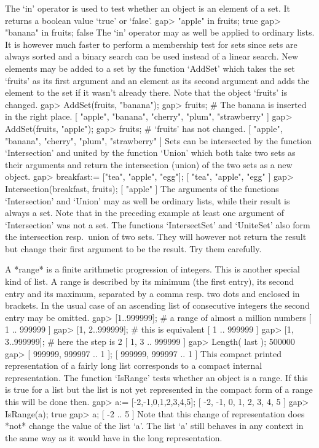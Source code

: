 The `in' operator is  used  to test whether an  object is an element of a
set.  It returns a boolean value `true' or `false'.
\beginexample
    gap> "apple" in fruits;
    true
    gap> "banana" in fruits;
    false 
\endexample
The `in' operator may as well be applied to ordinary lists. It is however
much faster to perform  a membership test for sets  since sets are always
sorted and a binary  search can be used instead  of a linear search.  New
elements may be added to a  set by the function  `AddSet' which takes the
set `fruits' as its first argument and an  element as its second argument
and adds the element to the set if it wasn't already there. Note that the
object `fruits' is changed.
\beginexample
    gap> AddSet(fruits, "banana");
    gap> fruits;        #  The banana is inserted in the right place.
    [ "apple", "banana", "cherry", "plum", "strawberry" ]
    gap> AddSet(fruits, "apple");
    gap> fruits;        #  `fruits' has not changed.
    [ "apple", "banana", "cherry", "plum", "strawberry" ] 
\endexample
Sets can be intersected by the function `Intersection'  and united by the
function `Union' which both take  two sets as their arguments  and return
the intersection (union) of the two sets as a new object.
\beginexample
    gap> breakfast:= ["tea", "apple", "egg"];
    [ "tea", "apple", "egg" ]
    gap> Intersection(breakfast, fruits);
    [ "apple" ] 
\endexample
The arguments of the functions `Intersection' and `Union'  may as well be
ordinary lists,  while  their result is  always  a set. Note that  in the
preceding example at least one argument of  `Intersection' was not a set.
The functions `IntersectSet'  and `UniteSet'  also form the  intersection
resp.~union  of  two sets. They  will  however not return  the result but
change their first argument to be the result. Try them carefully.


A *range* is a finite arithmetic progression of integers. This is another
special kind   of list. A range  is  described by its minimum  (the first
entry), its second entry and its maximum, separated  by a comma resp. two
dots and enclosed in brackets. In the usual case  of an ascending list of
consecutive integers the second entry may be omitted.
\beginexample
    gap> [1..999999];     #  a range of almost a million numbers
    [ 1 .. 999999 ]
    gap> [1, 2..999999];  #  this is equivalent
    [ 1 .. 999999 ]
    gap> [1, 3..999999];  #  here the step is 2
    [ 1, 3 .. 999999 ]
    gap> Length( last );
    500000
    gap> [ 999999, 999997 .. 1 ];
    [ 999999, 999997 .. 1 ]
\endexample
This compact printed representation of a fairly long  list corresponds to
a  compact internal representation.  The function `IsRange' tests whether
an object is a range.  If this is true for a list but the list is not yet
represented in the compact form of a range this will be done then.
\beginexample
    gap> a:= [-2,-1,0,1,2,3,4,5];
    [ -2, -1, 0, 1, 2, 3, 4, 5 ]
    gap> IsRange(a);
    true
    gap> a;
    [ -2 .. 5 ]
\endexample
Note that this  change of representation does  *not* change the  value of
the list `a'. The list `a'  still behaves in any context  in the same way
as it would have in the long representation.

